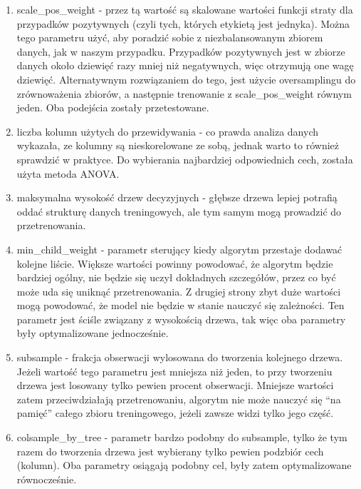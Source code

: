 \documentclass[12pt]{article}
\begin{document}
\begin{enumerate}
    \item scale\_pos\_weight - przez tą wartość są skalowane wartości funkcji straty dla przypadków pozytywnych (czyli tych, których etykietą jest jednyka). Można tego parametru użyć, aby poradzić sobie z niezbalansowanym zbiorem danych, jak w naszym przypadku. Przypadków pozytywnych jest w zbiorze danych około dziewięć razy mniej niż negatywnych, więc otrzymują one wagę dziewięć. Alternatywnym rozwiązaniem do tego, jest użycie oversamplingu do zrównoważenia zbiorów, a następnie trenowanie z scale\_pos\_weight równym jeden. Oba podejścia zostały przetestowane.
    
    \item liczba kolumn użytych do przewidywania - co prawda analiza danych wykazała, ze kolumny są nieskorelowane ze sobą, jednak warto to również sprawdzić w praktyce. Do wybierania najbardziej odpowiednich cech, została użyta metoda ANOVA.
    
    \item maksymalna wysokość drzew decyzyjnych - głębsze drzewa lepiej potrafią oddać strukturę danych treningowych, ale tym samym mogą prowadzić do przetrenowania.
    
    \item min\_child\_weight - parametr sterujący kiedy algorytm przestaje dodawać kolejne liście. Większe wartości powinny powodować, że algorytm będzie bardziej ogólny, nie będzie się uczył dokładnych szczegółów, przez co być może uda się uniknąć przetrenowania. Z drugiej strony zbyt duże wartości mogą powodować, że model nie będzie w stanie nauczyć się zależności. Ten parametr jest ściśle związany z wysokością drzewa, tak więc oba parametry były optymalizowane jednocześnie. 
    
    \item subsample - frakcja obserwacji wylosowana do tworzenia kolejnego drzewa. Jeżeli wartość tego parametru jest mniejsza niż jeden, to przy tworzeniu drzewa jest losowany tylko pewien procent obserwacji. Mniejsze wartości zatem przeciwdziałają przetrenowaniu, algorytm nie może nauczyć się ``na pamięć'' całego zbioru treningowego, jeżeli zawsze widzi tylko jego część.
    
    \item colsample\_by\_tree - parametr bardzo podobny do subsample, tylko że tym razem do tworzenia drzewa jest wybierany tylko pewien podzbiór cech (kolumn). Oba parametry osiągają podobny cel, były zatem optymalizowane równocześnie.
    

\end{enumerate}
\end{document}

